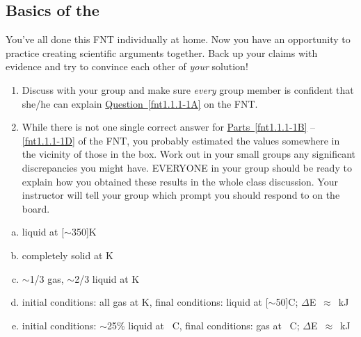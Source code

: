 \subsection{Basics of the \ThreePhaseModel{}}

\begin{fnt}
	
\end{fnt}

\noindent
You've all done this FNT individually at home. Now you have an opportunity to practice creating scientific arguments together. Back up your claims with evidence and try to convince each other of \emph{your} solution!

\begin{enumerate}
	\item Discuss with your group and make sure \emph{every} group member is confident that she/he can explain \hyperref[fnt1.1.1-1A]{Question~\ref*{fnt1.1.1-1A}} on the FNT.
	
	\item While there is not one single correct answer for \hyperref[fnt1.1.1-1B]{Parts~\ref*{fnt1.1.1-1B}} -- \hyperref[fnt1.1.1-1D]{\ref*{fnt1.1.1-1D}} of the FNT, you probably estimated the values somewhere in the vicinity of those in the box. Work out in your small groups any significant discrepancies you might have. EVERYONE in your group should be ready to explain how you obtained these results in the whole class discussion. Your instructor will tell your group which prompt you should respond to on the board.
\end{enumerate}

\begin{ans}
	\begin{enumerate}[(a)]
		\item liquid at \unit[$\sim$350]{K}
		\item completely solid at \unit[273]{K}
		\item $\sim$1/3 gas, $\sim$2/3 liquid at \unit[373]{K}
		\item initial conditions: all gas at \unit[373]{K}, final conditions: liquid at \unit[$\sim$50]{\textdegree C}; $\Delta$E~$\approx$~\unit[2470]{kJ}
		\item initial conditions: $\sim$25\% liquid at \unit[0]{\textdegree C}, final conditions: gas at \unit[100]{\textdegree C}; $\Delta$E~$\approx$~\unit[3000]{kJ}
	\end{enumerate}
\end{ans}


